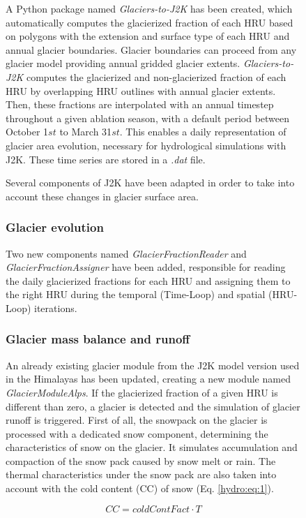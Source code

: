\begin{figure}[h]
A Python package named \textit{Glaciers-to-J2K} has been created, which automatically computes the glacierized fraction of each HRU based on polygons with the extension and surface type of each HRU and annual glacier boundaries. Glacier boundaries can proceed from any glacier model providing annual gridded glacier extents. \textit{Glaciers-to-J2K} computes the glacierized and non-glacierized fraction of each HRU by overlapping HRU outlines with annual glacier extents. Then, these fractions are interpolated with an annual timestep throughout a given ablation season, with a default period between October 1${st}$ to March 31${st}$. This enables a daily representation of glacier area evolution, necessary for hydrological simulations with J2K. These time series are stored in a \textit{.dat} file.

Several components of J2K have been adapted in order to take into account these changes in glacier surface area. 

\subsubsection{Glacier evolution}

Two new components named \textit{GlacierFractionReader} and \textit{GlacierFractionAssigner} have been added, responsible for reading the daily glacierized fractions for each HRU and assigning them to the right HRU during the temporal (Time-Loop) and spatial (HRU-Loop) iterations. 

\subsubsection{Glacier mass balance and runoff}

An already existing glacier module from the J2K model version used in the Himalayas has been updated, creating a new module named \textit{GlacierModuleAlps}. If the glacierized fraction of a given HRU is different than zero, a glacier is detected and the simulation of glacier runoff is triggered. First of all, the snowpack on the glacier is processed with a dedicated snow component, determining the characteristics of snow on the glacier. It simulates accumulation and compaction of the snow pack caused by snow melt or rain. The thermal characteristics under the snow pack are also taken into account with the cold content (CC) of snow (Eq. \ref{hydro:eq:1}).

\begin{equation} \label{hydro:eq:1}
 CC = coldContFact \cdot T
 \end{equation} 
 

\end{figure}
